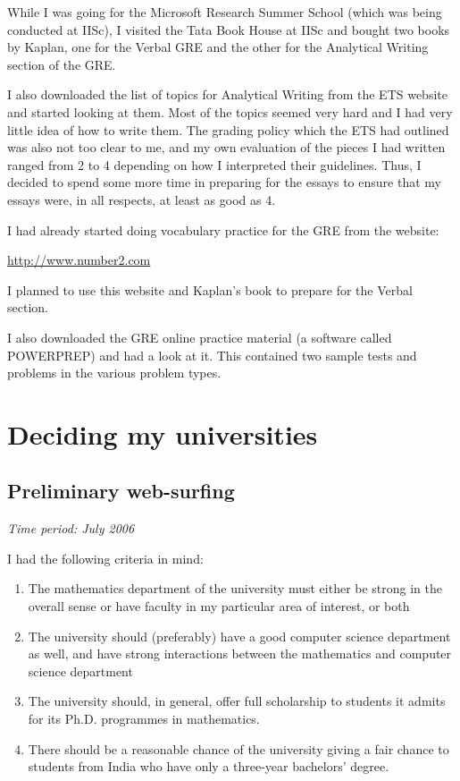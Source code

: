 \documentclass[a4paper]{amsart}
\begin{document}
While I was going for the Microsoft Research Summer School (which was
being conducted at IISc), I visited the Tata Book House at IISc and bought
two books by Kaplan, one for the Verbal GRE and the other for the Analytical
Writing section of the GRE.

I also downloaded the list of topics for Analytical Writing from the
ETS website and started looking at them. Most of the topics seemed
very hard and I had very little idea of how to write them. The grading
policy which the ETS had outlined was also not too clear to me, and my
own evaluation of the pieces I had written ranged from 2 to 4
depending on how I interpreted their guidelines. Thus, I decided to
spend some more time in preparing for the essays to ensure that my essays
were, in all respects, at least as good as 4.

I had already started doing vocabulary practice for the GRE from the website:

\url{http://www.number2.com}

I planned to use this website and Kaplan's book to prepare for the
Verbal section.

I also downloaded the GRE online practice material (a software called
POWERPREP) and had a look at it. This contained two sample tests and
problems in the various problem types.

\section{Deciding my universities}

\subsection{Preliminary web-surfing}

{\em Time period: July 2006}

I had the following criteria in mind:

\begin{enumerate}

\item The mathematics department of the university must either be strong
  in the overall sense or have faculty in my particular area of interest,
  or both

\item The university should (preferably) have a good computer science
  department as well, and have strong interactions between
  the mathematics and computer science department

\item The university should, in general, offer full scholarship to students
  it admits for its Ph.D. programmes in mathematics.

\item There should be a reasonable chance of the university giving a fair
  chance to students from India who have only a three-year bachelors' degree.

\end{enumerate}
\end{document}
